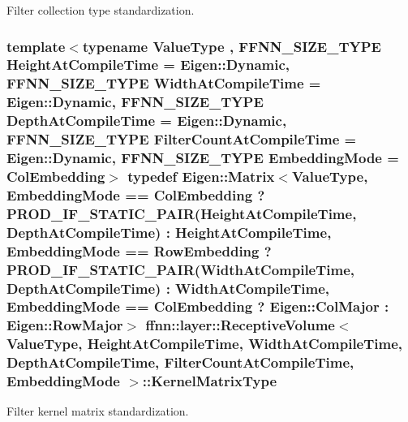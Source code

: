 Filter collection type standardization. 

\hypertarget{classffnn_1_1layer_1_1_receptive_volume_af207f604ba81e52546c400dd85de014f}{
\subsubsection[{Kernel\-Matrix\-Type}]{\setlength{\rightskip}{0pt plus 5cm}template$<$typename Value\-Type , F\-F\-N\-N\-\_\-\-S\-I\-Z\-E\-\_\-\-T\-Y\-P\-E Height\-At\-Compile\-Time = Eigen\-::\-Dynamic, F\-F\-N\-N\-\_\-\-S\-I\-Z\-E\-\_\-\-T\-Y\-P\-E Width\-At\-Compile\-Time = Eigen\-::\-Dynamic, F\-F\-N\-N\-\_\-\-S\-I\-Z\-E\-\_\-\-T\-Y\-P\-E Depth\-At\-Compile\-Time = Eigen\-::\-Dynamic, F\-F\-N\-N\-\_\-\-S\-I\-Z\-E\-\_\-\-T\-Y\-P\-E Filter\-Count\-At\-Compile\-Time = Eigen\-::\-Dynamic, F\-F\-N\-N\-\_\-\-S\-I\-Z\-E\-\_\-\-T\-Y\-P\-E Embedding\-Mode = Col\-Embedding$>$ typedef Eigen\-::\-Matrix$<$Value\-Type, {\bf Embedding\-Mode} == {\bf Col\-Embedding} ? {\bf P\-R\-O\-D\-\_\-\-I\-F\-\_\-\-S\-T\-A\-T\-I\-C\-\_\-\-P\-A\-I\-R}(Height\-At\-Compile\-Time, Depth\-At\-Compile\-Time) \-: Height\-At\-Compile\-Time, {\bf Embedding\-Mode} == {\bf Row\-Embedding} ? {\bf P\-R\-O\-D\-\_\-\-I\-F\-\_\-\-S\-T\-A\-T\-I\-C\-\_\-\-P\-A\-I\-R}(Width\-At\-Compile\-Time, Depth\-At\-Compile\-Time) \-: Width\-At\-Compile\-Time, {\bf Embedding\-Mode} == {\bf Col\-Embedding} ? Eigen\-::\-Col\-Major \-: Eigen\-::\-Row\-Major$>$ {\bf ffnn\-::layer\-::\-Receptive\-Volume}$<$ Value\-Type, Height\-At\-Compile\-Time, Width\-At\-Compile\-Time, Depth\-At\-Compile\-Time, Filter\-Count\-At\-Compile\-Time, {\bf Embedding\-Mode} $>$\-::{\bf Kernel\-Matrix\-Type}}}\label{classffnn_1_1layer_1_1_receptive_volume_af207f604ba81e52546c400dd85de014f}


Filter kernel matrix standardization. 

